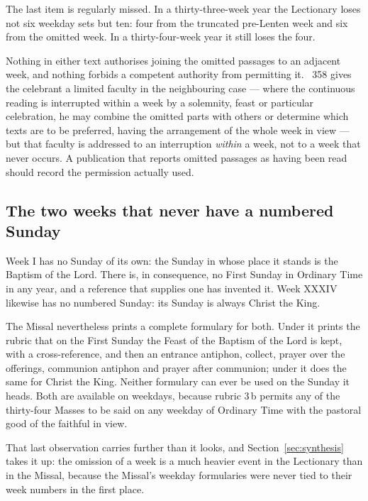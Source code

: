 The last item is regularly missed. In a thirty-three-week year the Lectionary loses not six weekday
sets but ten: four from the truncated pre-Lenten week and six from the omitted week. In a
thirty-four-week year it still loses the four.

Nothing in either text authorises joining the omitted passages to an adjacent week, and nothing
forbids a competent authority from permitting it. ~358 gives the celebrant a limited
faculty in the neighbouring case --- where the continuous reading is interrupted within a week by a
solemnity, feast or particular celebration, he may combine the omitted parts with others or determine
which texts are to be preferred, having the arrangement of the whole week in view --- but that
faculty is addressed to an interruption \emph{within} a week, not to a week that never occurs. A
publication that reports omitted passages as having been read should record the permission actually
used.

\subsection{The two weeks that never have a numbered Sunday}

Week I has no Sunday of its own: the Sunday in whose place it stands is the Baptism of the Lord.
There is, in consequence, no First Sunday in Ordinary Time in any year, and a reference that
supplies one has invented it. Week XXXIV likewise has no numbered Sunday: its Sunday is always
Christ the King.

The Missal nevertheless prints a complete formulary for both. Under 
it prints the rubric that on the First Sunday the Feast of the Baptism of the Lord is kept, with a
cross-reference, and then an entrance antiphon, collect, prayer over the offerings, communion
antiphon and prayer after communion; under  it does the same for
Christ the King. Neither formulary can ever be used on the Sunday it heads. Both are available on
weekdays, because rubric 3\,b permits any of the thirty-four Masses to be said on any weekday of
Ordinary Time with the pastoral good of the faithful in view.

That last observation carries further than it looks, and Section~\ref{sec:synthesis} takes it up:
the omission of a week is a much heavier event in the Lectionary than in the Missal, because the
Missal's weekday formularies were never tied to their week numbers in the first place.
